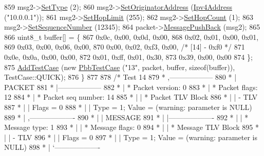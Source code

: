 \begin{DoxyCode}
859     msg2->\hyperlink{classns3_1_1PbbMessage_a4b3d1eaabd3e7412a46ac79bf3360dac}{SetType} (2);
860     msg2->\hyperlink{classns3_1_1PbbMessage_a52ac135a2bec53db5e8f46b8b8a25e7c}{SetOriginatorAddress} (\hyperlink{classns3_1_1Ipv4Address}{Ipv4Address} (\textcolor{stringliteral}{"10.0.0.1"}));
861     msg2->\hyperlink{classns3_1_1PbbMessage_a532a7e5e135f7491f8a84ab1dfadd28f}{SetHopLimit} (255);
862     msg2->\hyperlink{classns3_1_1PbbMessage_a882ec7e2e9a9dff6297152c196d54ce4}{SetHopCount} (1);
863     msg2->\hyperlink{classns3_1_1PbbMessage_a8c24696ac67507afa03c9750daccc47d}{SetSequenceNumber} (12345);
864     packet->\hyperlink{classns3_1_1PbbPacket_a4a3170001ef758d9c9c4375b8f089826}{MessagePushBack} (msg2);
865 
866     uint8\_t buffer[] = \{
867       0x0c, 0x00, 0x0d, 0x00,
868       0x02, 0x01, 0x00, 0x01,
869       0x03, 0x00, 0x06, 0x00,
870       0x00, 0x02, 0xf3, 0x00,   \textcolor{comment}{/* [14] - 0xf0 */}
871       0x0e, 0x0a, 0x00, 0x00,
872       0x01, 0xff, 0x01, 0x30,
873       0x39, 0x00, 0x00
874     \};
875     \hyperlink{classns3_1_1TestCase_a3718088e3eefd5d6454569d2e0ddd835}{AddTestCase} (\textcolor{keyword}{new} \hyperlink{classPbbTestCase}{PbbTestCase} (\textcolor{stringliteral}{"13"}, packet, buffer, \textcolor{keyword}{sizeof}(buffer)), 
      TestCase::QUICK);
876   \}
877 
878   \textcolor{comment}{/* Test 14}
879 \textcolor{comment}{         * ,------------------}
880 \textcolor{comment}{         * |  PACKET}
881 \textcolor{comment}{         * |------------------}
882 \textcolor{comment}{         * | * Packet version:    0}
883 \textcolor{comment}{         * | * Packet flags:  12}
884 \textcolor{comment}{         * | * Packet seq number: 14}
885 \textcolor{comment}{         * |    | * Packet TLV Block}
886 \textcolor{comment}{         * |    |     - TLV}
887 \textcolor{comment}{         * |    |         Flags = 0}
888 \textcolor{comment}{         * |    |         Type = 1; Value = (warning: parameter is NULL)}
889 \textcolor{comment}{         * |    ,-------------------}
890 \textcolor{comment}{         * |    |  MESSAGE}
891 \textcolor{comment}{         * |    |-------------------}
892 \textcolor{comment}{         * |    | * Message type:       1}
893 \textcolor{comment}{         * |    | * Message flags:  0}
894 \textcolor{comment}{         * |    | * Message TLV Block}
895 \textcolor{comment}{         * |    |     - TLV}
896 \textcolor{comment}{         * |    |         Flags = 0}
897 \textcolor{comment}{         * |    |         Type = 1; Value = (warning: parameter is NULL)}
898 \textcolor{comment}{         * |    `-------------------}

\end{DoxyCode}

